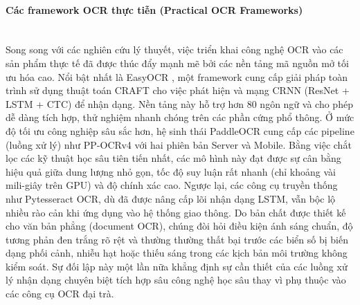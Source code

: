 \documentclass[../DoAn.tex]{subfiles}
\begin{document}
\paragraph{Các framework OCR thực tiễn (Practical OCR Frameworks) }
\mbox{}\\
Song song với các nghiên cứu lý thuyết, việc triển khai công nghệ OCR vào các sản phẩm thực tế đã được thúc đẩy mạnh mẽ bởi các nền tảng mã nguồn mở tối ưu hóa cao. Nổi bật nhất là EasyOCR \cite{jaided2020easyocr}, một framework cung cấp giải pháp toàn trình sử dụng thuật toán CRAFT cho việc phát hiện và mạng CRNN (ResNet + LSTM + CTC) để nhận dạng. Nền tảng này hỗ trợ hơn 80 ngôn ngữ và cho phép dễ dàng tích hợp, thử nghiệm nhanh chóng trên các phần cứng phổ thông.
Ở mức độ tối ưu công nghiệp sâu sắc hơn, hệ sinh thái PaddleOCR \cite{paddleocr2020} cung cấp các pipeline (luồng xử lý) như PP-OCRv4 với hai phiên bản Server và Mobile. Bằng việc chắt lọc các kỹ thuật học sâu tiên tiến nhất, các mô hình này đạt được sự cân bằng hiệu quả giữa dung lượng nhỏ gọn, tốc độ suy luận rất nhanh (chỉ khoảng vài mili-giây trên GPU) và độ chính xác cao. Ngược lại, các công cụ truyền thống như Pytesseract OCR, dù đã được nâng cấp lõi nhận dạng LSTM, vẫn bộc lộ nhiều rào cản khi ứng dụng vào hệ thống giao thông. Do bản chất được thiết kế cho văn bản phẳng (document OCR), chúng đòi hỏi điều kiện ánh sáng chuẩn, độ tương phản đen trắng rõ rệt và thường thường thất bại trước các biển số bị biến dạng phối cảnh, nhiễu hạt hoặc thiếu sáng trong các kịch bản môi trường không kiểm soát. Sự đối lập này một lần nữa khẳng định sự cần thiết của các luồng xử lý nhận dạng chuyên biệt tích hợp sâu công nghệ học sâu thay vì phụ thuộc vào các công cụ OCR đại trà.

\end{document}
